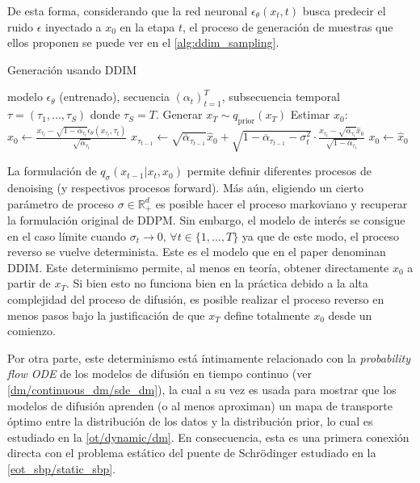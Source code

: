 De esta forma, considerando que la red neuronal $\epsilon_\theta(x_t,t)$ busca predecir el ruido $\epsilon$ inyectado a $x_0$ en la etapa $t$, el proceso de generación de muestras que ellos proponen se puede ver en el \autoref{alg:ddim_sampling}.

\begin{algorithm}
    \caption{Generación usando DDIM}
   \label{alg:ddim_sampling}
   \begin{algorithmic}[1]
   \Require modelo $\epsilon_\theta$ (entrenado), secuencia $(\alpha_t)_{t=1}^T$, subsecuencia temporal $\tau = (\tau_1, ..., \tau_S)$ donde $\tau_S = T$.
   \State Generar $x_T \sim q_{\text{prior}}(x_T)$
   \State Estimar $x_0$: $\hat{x}_0 \gets \frac{x_{\tau_t} - \sqrt{1-\overline{\alpha}_{\tau_t}}\epsilon_\theta(x_{\tau_t},\tau_t)}{\sqrt{\overline{\alpha}_{\tau_t}}}$
   \State $x_{\tau_{t-1}} \gets \sqrt{\overline{\alpha}_{\tau_{t-1}}}\hat{x}_0 + \sqrt{1-\overline{\alpha}_{\tau_{t-1}}-\sigma_t^2}\cdot\frac{x_{\tau_t}-\sqrt{\overline{\alpha}_{\tau_t}}\hat{x}_0}{\sqrt{1-\overline{\alpha}_{\tau_t}}}$
   \EndIf
   \EndFor
   \State \Return $x_0 \gets \hat{x}_0$
   \end{algorithmic}
\end{algorithm}

La formulación de $q_\sigma(x_{t-1}|x_t,x_0)$ permite definir diferentes procesos de denoising (y respectivos procesos forward). Más aún, eligiendo un cierto parámetro de proceso $\sigma\in\mathbb{R}^d_+$ es posible hacer el proceso markoviano y recuperar la formulación original de DDPM. Sin embargo, el modelo de interés se consigue en el caso límite cuando $\sigma_t\to 0,\,\forall t\in\{1,\ldots, T\}$ ya que de este modo, el proceso reverso se vuelve determinista. Este es el modelo que en el paper denominan DDIM. Este determinismo permite, al menos en teoría, obtener directamente $x_0$ a partir de $x_T$. Si bien esto no funciona bien en la práctica debido a la alta complejidad del proceso de difusión, es posible realizar el proceso reverso en menos pasos bajo la justificación de que $x_T$ define totalmente $x_0$ desde un comienzo.

Por otra parte, este determinismo está íntimamente relacionado con la \textit{probability flow ODE} de los modelos de difusión en tiempo continuo (ver \autoref{dm/continuous_dm/sde_dm}), la cual a su vez es usada para mostrar que los modelos de difusión aprenden (o al menos aproximan) un mapa de transporte óptimo entre la distribución de los datos y la distribución prior, lo cual es estudiado en la \autoref{ot/dynamic/dm}. En consecuencia, esta es una primera conexión directa con el problema estático del puente de Schrödinger estudiado en la \autoref{eot_sbp/static_sbp}.

